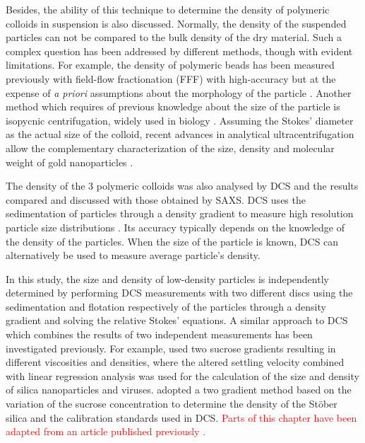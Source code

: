 Besides, the ability of this technique to determine the density of polymeric colloids in suspension is also discussed. Normally, the density of the suspended particles can not be compared to the bulk density of the dry material. Such a complex question has been addressed by different methods, though with evident limitations. For example, the density of polymeric beads has been measured previously with field-flow fractionation (FFF) with high-accuracy but at the expense of \emph{a priori} assumptions about the morphology of the particle \citep{giddings_density_1981,yang_colloid_1983,caldwell_measurement_1986}. Another method which requires of previous knowledge about the size of the particle is isopycnic centrifugation, widely used in biology \citep{vauthier_measurement_1999}. Assuming the Stokes' diameter as the actual size of the colloid, recent advances in analytical ultracentrifugation allow the complementary characterization of the size, density and molecular weight of gold nanoparticles \citep{carney_determination_2011}.

The density of the 3 polymeric colloids was also analysed by DCS and the results compared and discussed with those obtained by SAXS. DCS uses the sedimentation of particles through a density gradient to measure high resolution particle size distributions \citep{minelli_characterization_2014}. Its accuracy typically depends on the knowledge of the density of the particles. When the size of the particle is known, DCS can alternatively be used to measure average particle's density.

In this study, the size and density of low-density particles is independently determined by performing DCS measurements with two different discs using the sedimentation and flotation respectively of the particles through a density gradient and solving the relative Stokes' equations. A similar approach to DCS which combines the results of two independent measurements has been investigated previously. For example, \cite{neumann_new_2013} used two sucrose gradients resulting in different viscosities and densities, where the altered settling velocity combined with linear regression analysis was used for the calculation of the size and density of silica nanoparticles and viruses. \cite{bell_emerging_2012} adopted a two gradient method based on the variation of the sucrose concentration to determine the density of the St\"ober silica and the calibration standards used in DCS. \textcolor{red}{Parts of this chapter have been adapted from an article published previously \citep{garcia-diez_simultaneous_2016-1}.}

